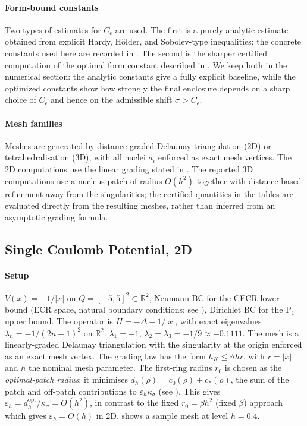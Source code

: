 \documentclass[11pt]{article}
\theoremstyle{plain}
\theoremstyle{definition}
\theoremstyle{remark}
\newcommand{\R}{\mathbb{R}}
\begin{document}
\paragraph{Form-bound constants}
Two types of estimates for $C_\epsilon$ are used.  The first is a
purely analytic estimate obtained from explicit Hardy, H\"older, and
Sobolev-type inequalities; the concrete constants used here are
recorded in .  The second is the sharper
certified computation of the optimal form constant described in
.  We keep both in the numerical section: the
analytic constants give a fully explicit baseline, while the optimized
constants show how strongly the final enclosure depends on a sharp
choice of $C_\epsilon$ and hence on the admissible shift
$\sigma>C_\epsilon$.

\paragraph{Mesh families}
Meshes are generated by distance-graded Delaunay triangulation (2D)
or tetrahedralisation (3D), with all nuclei $a_i$ enforced as exact
mesh vertices. The 2D computations use the linear grading stated in
. The reported
3D computations use a nucleus patch of radius $O(h^2)$ together with
distance-based refinement away from the singularities; the certified
quantities in the tables are evaluated directly from the resulting
meshes, rather than inferred from an asymptotic grading formula.

\subsection{Single Coulomb Potential, 2D}
\label{subsec:num-coulomb-2d}

\paragraph{Setup}
$V(x) = -1/|x|$ on $Q=[-5,5]^2\subset\R^2$, Neumann BC for the CECR lower
bound (ECR space, natural boundary conditions; see ),
Dirichlet BC for the $\mathrm{P}_1$ upper bound.
The operator is $H = -\Delta - 1/|x|$, with exact eigenvalues
$\lambda_n = -1/(2n-1)^2$ on $\R^2$:
$\lambda_1 = -1$, $\lambda_2 = \lambda_3 = -1/9 \approx -0.1111$.
The mesh is a linearly-graded Delaunay triangulation
with the singularity at the origin enforced as an exact mesh vertex.
The grading law has the form $h_K\le\vartheta h r$, with $r=|x|$ and
$h$ the nominal mesh parameter.
The first-ring radius $r_0$ is chosen as the \emph{optimal-patch radius}:
it minimises $d_h(\rho)=c_0(\rho)+c_*(\rho)$, the sum of the patch and
off-patch contributions to $\varepsilon_h\kappa_\sigma$ (see
).
This gives $\varepsilon_h=d_h^{\mathrm{opt}}/\kappa_\sigma=O(h^2)$,
in contrast to the fixed $r_0=\beta h^2$ (fixed $\beta$) approach
which gives $\varepsilon_h=O(h)$ in 2D.
 shows a sample mesh at level $h=0.4$.
\end{document}
